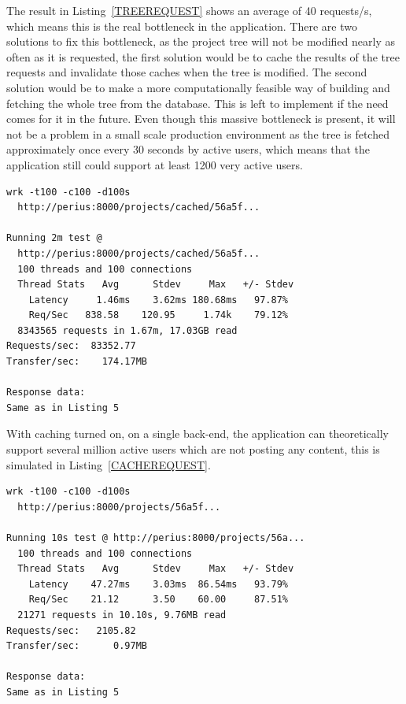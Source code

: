 \documentclass[a4paper,12pt]{article}
\begin{document}
The result in Listing~\ref{TREEREQUEST} shows an average of 40 requests/s, which means this is the
real bottleneck in the application. There are two solutions to fix this bottleneck, as the project
tree will not be modified nearly as often as it is requested, the first solution would be to cache
the results of the tree requests and invalidate those caches when the tree is modified. The second
solution would be to make a more computationally feasible way of building and fetching the whole
tree from the database. This is left to implement if the need comes for it in the future. Even
though this massive bottleneck is present, it will not be a problem in a small scale production
environment as the tree is fetched approximately once every 30 seconds by active users, which means
that the application still could support at least 1200 very active users.

\begin{minipage}{\linewidth-1cm}
\begin{lstlisting}[label=CACHEREQUEST,caption=Result of cached project tree requests]
wrk -t100 -c100 -d100s 
  http://perius:8000/projects/cached/56a5f...
 
Running 2m test @ 
  http://perius:8000/projects/cached/56a5f...
  100 threads and 100 connections
  Thread Stats   Avg      Stdev     Max   +/- Stdev
    Latency     1.46ms    3.62ms 180.68ms   97.87%
    Req/Sec   838.58    120.95     1.74k    79.12%
  8343565 requests in 1.67m, 17.03GB read
Requests/sec:  83352.77
Transfer/sec:    174.17MB

Response data:
Same as in Listing 5
\end{lstlisting}
\end{minipage}

\par
With caching turned on, on a single back-end, the application can theoretically support several 
million active users which are not posting any content, this is simulated in 
Listing~\ref{CACHEREQUEST}.

\begin{minipage}{\linewidth-1cm}
\begin{lstlisting}[label=INDEXREQUEST,caption=Result of indexed project tree requests]
wrk -t100 -c100 -d100s 
  http://perius:8000/projects/56a5f...
 
Running 10s test @ http://perius:8000/projects/56a...
  100 threads and 100 connections
  Thread Stats   Avg      Stdev     Max   +/- Stdev
    Latency    47.27ms    3.03ms  86.54ms   93.79%
    Req/Sec    21.12      3.50    60.00     87.51%
  21271 requests in 10.10s, 9.76MB read
Requests/sec:   2105.82
Transfer/sec:      0.97MB

Response data:
Same as in Listing 5
\end{lstlisting}
\end{minipage}
\end{document}
